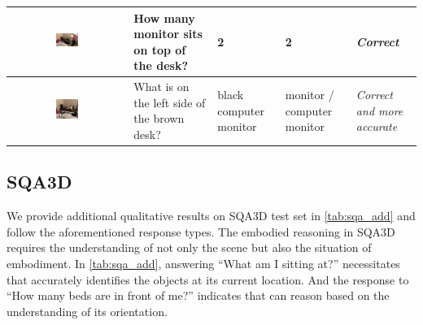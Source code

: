 \begin{table}[t]
\begin{tabular}{c|p{6em}|p{6em}|p{8em}|p{6em}}
         \midrule
         \raisebox{-1\height}
         {\includegraphics[width=0.2\textwidth]{figs/vis_scanqa_4.jpg}} &
         How many monitor sits on top of the desk? & 2 & 2 & \textit{Correct} \\
         
         \midrule
            \raisebox{-1\height}
            {\includegraphics[width=0.2\textwidth]{figs/vis_scanqa_6.jpg}} & 
            What is on the left side of the brown desk? &
            black computer monitor & monitor / computer monitor &
            \textit{Correct and more accurate} \\
        \bottomrule
\end{tabular}

\label{tab:ScanQA_add}
\end{table}

\subsection{SQA3D}
We provide additional qualitative results on SQA3D test set in \cref{tab:sqa_add} and follow the aforementioned response types. The embodied reasoning in SQA3D requires the understanding of not only the scene but also the situation of embodiment. In \cref{tab:sqa_add}, answering ``What am I sitting at?'' necessitates that \agent accurately identifies the objects at its current location. And the response to ``How many beds are in front of me?'' indicates that \agent can reason based on the understanding of its orientation.


